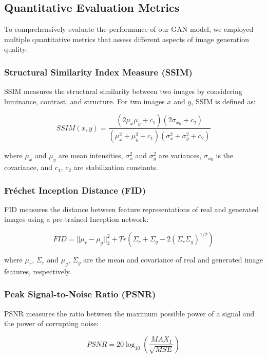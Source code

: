 \documentclass[a4paper, journal]{IEEEtran}
\begin{document}
\subsection{Quantitative Evaluation Metrics}

To comprehensively evaluate the performance of our GAN model, we employed multiple quantitative metrics that assess different aspects of image generation quality:

\subsubsection{Structural Similarity Index Measure (SSIM)}
SSIM measures the structural similarity between two images by considering luminance, contrast, and structure. For two images $x$ and $y$, SSIM is defined as:

\begin{equation}
    SSIM(x,y) = \frac{(2\mu_x\mu_y + c_1)(2\sigma_{xy} + c_2)}{(\mu_x^2 + \mu_y^2 + c_1)(\sigma_x^2 + \sigma_y^2 + c_2)}
    \label{eq:ssim}
\end{equation}

where $\mu_x$ and $\mu_y$ are mean intensities, $\sigma_x^2$ and $\sigma_y^2$ are variances, $\sigma_{xy}$ is the covariance, and $c_1$, $c_2$ are stabilization constants.

\subsubsection{Fréchet Inception Distance (FID)}
FID measures the distance between feature representations of real and generated images using a pre-trained Inception network:

\begin{equation}
    FID = ||\mu_r - \mu_g||_2^2 + Tr(\Sigma_r + \Sigma_g - 2(\Sigma_r\Sigma_g)^{1/2})
    \label{eq:fid}
\end{equation}

where $\mu_r$, $\Sigma_r$ and $\mu_g$, $\Sigma_g$ are the mean and covariance of real and generated image features, respectively.

\subsubsection{Peak Signal-to-Noise Ratio (PSNR)}
PSNR measures the ratio between the maximum possible power of a signal and the power of corrupting noise:

\begin{equation}
    PSNR = 20 \log_{10}\left(\frac{MAX_I}{\sqrt{MSE}}\right)
    \label{eq:psnr}
\end{equation}
\end{document}
